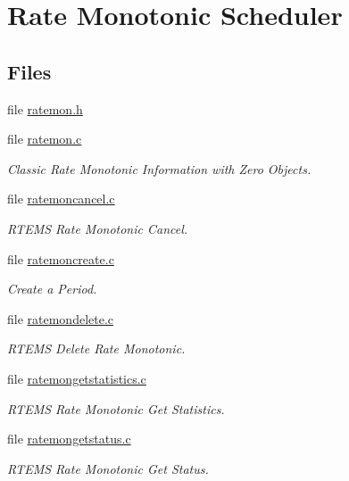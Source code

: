 \hypertarget{group__ClassicRateMon}{}\section{Rate Monotonic Scheduler}
\label{group__ClassicRateMon}
\subsection*{Files}
\begin{DoxyCompactItemize}
\item 
file \mbox{\hyperlink{ratemon_8h}{ratemon.\+h}}
\item 
file \mbox{\hyperlink{ratemon_8c}{ratemon.\+c}}
\begin{DoxyCompactList}\small\item\em Classic Rate Monotonic Information with Zero Objects. \end{DoxyCompactList}\item 
file \mbox{\hyperlink{ratemoncancel_8c}{ratemoncancel.\+c}}
\begin{DoxyCompactList}\small\item\em R\+T\+E\+MS Rate Monotonic Cancel. \end{DoxyCompactList}\item 
file \mbox{\hyperlink{ratemoncreate_8c}{ratemoncreate.\+c}}
\begin{DoxyCompactList}\small\item\em Create a Period. \end{DoxyCompactList}\item 
file \mbox{\hyperlink{ratemondelete_8c}{ratemondelete.\+c}}
\begin{DoxyCompactList}\small\item\em R\+T\+E\+MS Delete Rate Monotonic. \end{DoxyCompactList}\item 
file \mbox{\hyperlink{ratemongetstatistics_8c}{ratemongetstatistics.\+c}}
\begin{DoxyCompactList}\small\item\em R\+T\+E\+MS Rate Monotonic Get Statistics. \end{DoxyCompactList}\item 
file \mbox{\hyperlink{ratemongetstatus_8c}{ratemongetstatus.\+c}}
\begin{DoxyCompactList}\small\item\em R\+T\+E\+MS Rate Monotonic Get Status. \end{DoxyCompactList}\item 

\end{DoxyCompactItemize}
